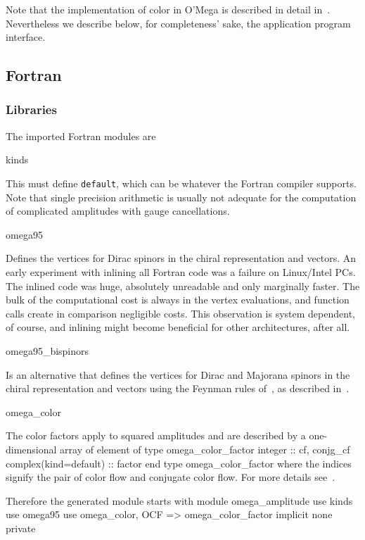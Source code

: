 \documentclass[12pt,a4paper]{article}
\newenvironment{files}%
 {\begin{list}{}%
   {\setlength{\leftmargin}{3em}%
    \setlength{\rightmargin}{3em}%
    \setlength{\itemindent}{1em}%
    \setlength{\listparindent}{0pt}%
    \settowidth{\labelwidth}{5em}%
    \renewcommand{\makelabel}[1]{\texttt{##1}}}}%
 {\end{list}}
\newenvironment{code}{\verbatim}{\endverbatim\noindent}
\begin{document}
Note that the implementation of color in O'Mega is described in detail
in~\cite{OMEGA2,cflow}.  Nevertheless we describe below, for
completeness' sake, the application program interface.
\subsection{Fortran}
\subsubsection{Libraries}
The imported Fortran modules are
\begin{files}
  \item[kinds]\hfil\par
    This must define \verb+default+, which can be whatever
    the Fortran compiler supports.  Note that single precision
    arithmetic is usually not adequate for the
    computation of complicated amplitudes with gauge cancellations.
  \item[omega95]\hfil\par
    Defines the vertices for Dirac spinors in the chiral
    representation and vectors. An early experiment with
    inlining all Fortran code was a failure on Linux/Intel PCs.
    The inlined code was huge, absolutely unreadable and only marginally
    faster.  The bulk of the computational cost is always in the vertex
    evaluations, and function calls create in comparison negligible costs.
    This observation is system dependent, of course, and inlining
    might become beneficial for other architectures, after all.
  \item[omega95\_bispinors]\hfil\par
    Is an alternative that defines the
    vertices for Dirac and Majorana spinors in the chiral
    representation and vectors using the Feynman rules
    of~\cite{Denner/etal:Majorana}, as described in~\cite{OMEGA2}.
  \item[omega\_color]\hfil\par
    The color factors apply to squared amplitudes and
    are described by a one-dimensional array of element of
\begin{code}
  type omega_color_factor
     integer :: cf, conjg_cf
     complex(kind=default) :: factor
  end type omega_color_factor
\end{code}
    where the indices signify the pair of color flow and conjugate
    color flow.  For more details see~\cite{OMEGA2}.
\end{files}
Therefore the generated module starts with
\begin{code}
module omega_amplitude
  use kinds
  use omega95
  use omega_color, OCF => omega_color_factor
  implicit none
  private
\end{code}
\end{document}
